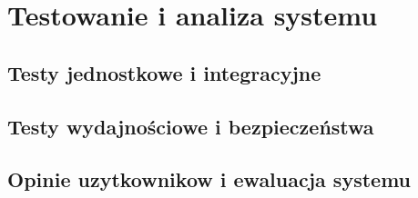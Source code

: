 \chapter{Testowanie i analiza systemu}

\section{Testy jednostkowe i integracyjne}

\section{Testy wydajnościowe i bezpieczeństwa}

\section{Opinie uzytkownikow i ewaluacja systemu}